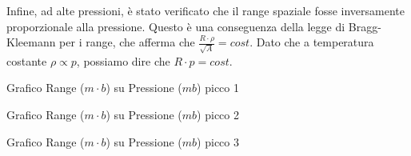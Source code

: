Infine, ad alte pressioni, è stato verificato che il range spaziale fosse inversamente proporzionale alla pressione. 
Questo è una conseguenza della legge di Bragg-Kleemann per i range, che afferma che $\frac{R\cdot\rho}{\sqrt{A}}=cost$. Dato che a temperatura costante $\rho\propto p$, possiamo dire che $R\cdot p=cost$.

\begin{grafico}
 \centering
 \resizebox{\textwidth}{!}{%
 
 }%
 \caption{Grafico Range ($m \cdot b$) su Pressione ($mb$) picco 1} 
 \label{gr:rp1.tex} 
\end{grafico}


\begin{grafico}
 \centering
 \resizebox{\textwidth}{!}{%
 
 }%
 \caption{Grafico Range ($m \cdot b$) su Pressione ($mb$) picco 2} 
 \label{gr:rp2.tex} 
\end{grafico}


\begin{grafico}
 \centering
 \resizebox{\textwidth}{!}{%
 
 }%
 \caption{Grafico Range ($m \cdot b$) su Pressione ($mb$) picco 3} 
 \label{gr:rp3.tex} 
\end{grafico}